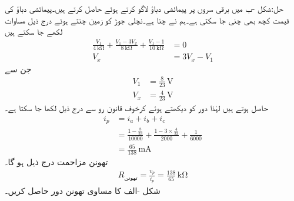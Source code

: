حل:شکل -ب میں برقی سروں  پر پیمائشی دباؤ لاگو کرتے ہوئے  حاصل کرتے ہیں۔پیمائشی دباؤ کی قیمت کچھ بھی چنی جا سکتی ہے۔ہم نے   چنا ہے۔نچلی جوڑ کو زمین چنتے ہوئے  درج ذیل مساوات لکھے جا سکتے ہیں
\begin{align*}
\frac{V_1}{\SI{4}{\kilo\ohm}}+\frac{V_1-3V_x}{\SI{8}{\kilo\ohm}}+\frac{V_1-1}{\SI{10}{\kilo\ohm}}&=0\\
V_x&=3V_x-V_1
\end{align*}
جن سے
\begin{align*}
V_1&=\frac{8}{23}\,\si{\volt}\\
V_x&=\frac{4}{23}\, \si{\volt}
\end{align*}
حاصل ہوتے ہیں لہٰذا دور کو دیکھتے ہوئے کرخوف قانون رو سے درج ذیل لکھا جا سکتا ہے۔
\begin{align*}
i_p&=i_a+i_b+i_c\\
&=\frac{1-\frac{8}{23}}{10000}+\frac{1-3\times \frac{4}{23}}{2000}+\frac{1}{6000}\\
&=\frac{65}{138}\, \si{\milli\ampere}
\end{align*}
تھونن مزاحمت درج ذیل ہو گا۔
\begin{align*}
R_{\text{تھونن}}=\frac{v_p}{i_p}=\frac{138}{65} \, \si{\kilo\ohm}
\end{align*}
شکل -الف کا مساوی تھونن دور حاصل کریں۔

